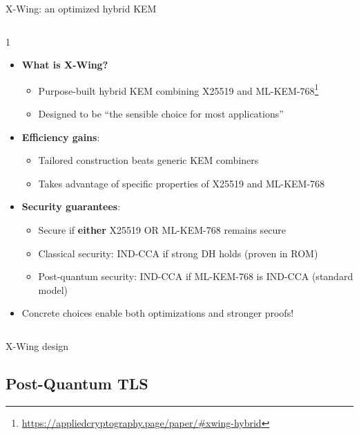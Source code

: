 \ifdefined\PRESENTATION\else\PassOptionsToClass{handout}{beamer}\fi\documentclass[aspectratio=169, lualatex]{beamer}
\begin{document}
\begin{frame}{X-Wing: an optimized hybrid KEM}
	\begin{columns}[c]
		\begin{column}{1\textwidth}
			\begin{itemize}
				\item \textbf{What is X-Wing?}
				      \begin{itemize}
					      \item Purpose-built hybrid KEM combining X25519 and ML-KEM-768\footnote{\url{https://appliedcryptography.page/paper/\#xwing-hybrid}}
					      \item Designed to be ``the sensible choice for most applications''
				      \end{itemize}
				\item \textbf{Efficiency gains}:
				      \begin{itemize}
					      \item Tailored construction beats generic KEM combiners
					      \item Takes advantage of specific properties of X25519 and ML-KEM-768
				      \end{itemize}
				\item \textbf{Security guarantees}:
				      \begin{itemize}
					      \item Secure if \textbf{either} X25519 OR ML-KEM-768 remains secure
					      \item Classical security: IND-CCA if strong DH holds (proven in ROM)
					      \item Post-quantum security: IND-CCA if ML-KEM-768 is IND-CCA (standard model)
				      \end{itemize}
				\item Concrete choices enable both optimizations and stronger proofs!
			\end{itemize}
		\end{column}
	\end{columns}
\end{frame}

\begin{frame}{X-Wing design}
\end{frame}

\subsection{Post-Quantum TLS}
\end{document}
